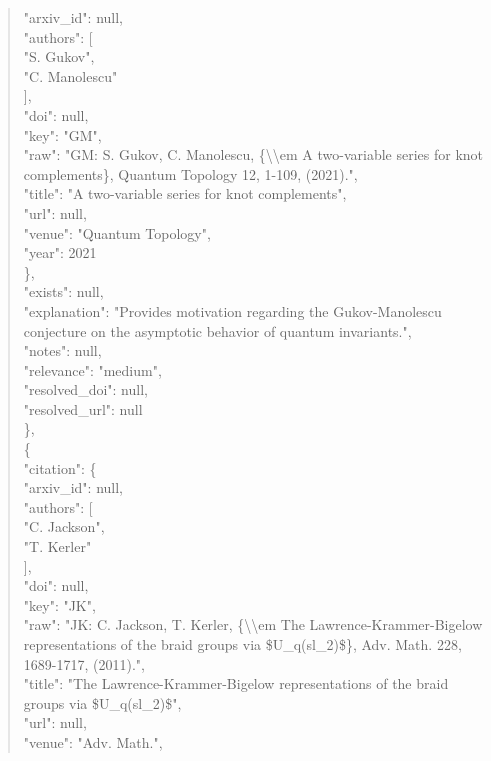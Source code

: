 \documentclass[11pt]{article}
\begin{document}
\begin{quote}
        "arxiv\_id": null,\\
        "authors": [\\
          "S. Gukov",\\
          "C. Manolescu"\\
        ],\\
        "doi": null,\\
        "key": "GM",\\
        "raw": "GM: S. Gukov, C. Manolescu, \{\textbackslash{}\textbackslash{}em A two-variable series for knot complements\}, Quantum Topology 12, 1-109, (2021).",\\
        "title": "A two-variable series for knot complements",\\
        "url": null,\\
        "venue": "Quantum Topology",\\
        "year": 2021\\
      \},\\
      "exists": null,\\
      "explanation": "Provides motivation regarding the Gukov-Manolescu conjecture on the asymptotic behavior of quantum invariants.",\\
      "notes": null,\\
      "relevance": "medium",\\
      "resolved\_doi": null,\\
      "resolved\_url": null\\
    \},\\
    \{\\
      "citation": \{\\
        "arxiv\_id": null,\\
        "authors": [\\
          "C. Jackson",\\
          "T. Kerler"\\
        ],\\
        "doi": null,\\
        "key": "JK",\\
        "raw": "JK: C. Jackson, T. Kerler, \{\textbackslash{}\textbackslash{}em The Lawrence-Krammer-Bigelow representations of the braid groups via \$U\_q(sl\_2)\$\}, Adv. Math. 228, 1689-1717, (2011).",\\
        "title": "The Lawrence-Krammer-Bigelow representations of the braid groups via \$U\_q(sl\_2)\$",\\
        "url": null,\\
        "venue": "Adv. Math.",\\

\end{quote}
\end{document}
